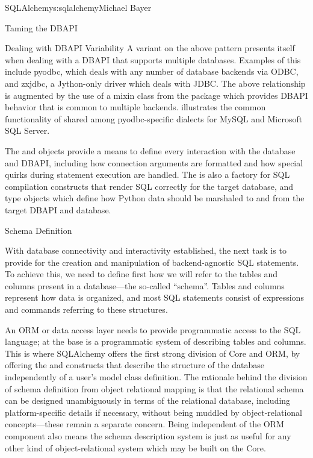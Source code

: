 \begin{aosachapter}{SQLAlchemy}{s:sqlalchemy}{Michael Bayer}
\begin{aosasect1}{Taming the DBAPI}
\begin{aosasect2}{Dealing with DBAPI Variability}
A variant on the above pattern presents itself when dealing with a DBAPI
that supports multiple databases.   Examples of this include
pyodbc, which deals with any number of database backends via ODBC,
and zxjdbc, a Jython-only driver which deals with JDBC.   The above
relationship is augmented by the use of a mixin class from the
 package which provides DBAPI behavior that
is common to multiple backends.   illustrates the common
functionality of  shared among
pyodbc-specific dialects for MySQL and Microsoft SQL Server.


The  and  objects provide a means
to define every interaction with the database and DBAPI,
including how connection arguments are formatted and how special
quirks during statement execution are handled. The 
is also a factory for SQL compilation constructs that render
SQL correctly for the target database, and type objects which
define how Python data should be marshaled to and from the target
DBAPI and database.

\end{aosasect2}

\end{aosasect1}

\begin{aosasect1}{Schema Definition}

With database connectivity and interactivity established, the next task
is to provide for the creation and manipulation of backend-agnostic
SQL statements.  To achieve this, we need to define first how we will
refer to the tables and columns present in a database---the so-called
``schema''.  Tables and columns represent how data
is organized, and most SQL statements consist of expressions and
commands referring to these structures.

An ORM or data access layer needs to provide programmatic access to the SQL
language; at the base is a programmatic system of describing tables and
columns. This is where SQLAlchemy offers the first strong division of Core
and ORM, by offering the  and  constructs that describe
the structure of the database independently of a user's model class
definition.  The rationale behind the division of schema definition from object
relational mapping is that the relational schema can be designed
unambiguously in terms of the relational database, including platform-specific
details if necessary, without being muddled by object-relational concepts---these 
remain a separate concern. Being independent of the ORM component also
means the schema description system is just as useful for any other kind of
object-relational system which may be built on the Core.


\end{aosasect1}
\end{aosachapter}
